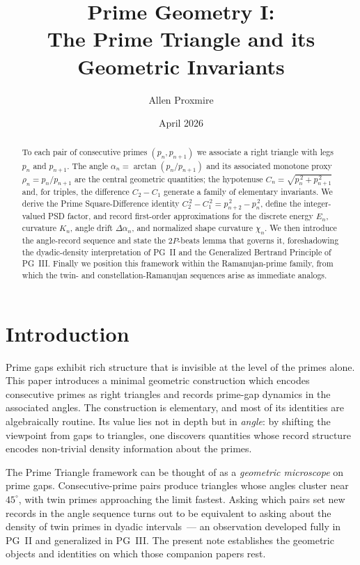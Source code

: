 \documentclass[11pt]{article}
\title{Prime Geometry I:\\
The Prime Triangle and its Geometric Invariants}
\author{Allen Proxmire}
\date{April 2026}
\begin{document}
\maketitle

\begin{abstract}
To each pair of consecutive primes $(p_n, p_{n+1})$ we associate a
right triangle with legs $p_n$ and $p_{n+1}$. The angle
$\alpha_n = \arctan(p_n/p_{n+1})$ and its associated monotone proxy
$\rho_n = p_n / p_{n+1}$ are the central geometric quantities; the
hypotenuse $C_n = \sqrt{p_n^{\,2} + p_{n+1}^{\,2}}$ and, for triples,
the difference $C_2 - C_1$ generate a family of elementary
invariants. We derive the Prime Square-Difference identity
$C_2^{\,2} - C_1^{\,2} = p_{n+2}^{\,2} - p_n^{\,2}$, define the
integer-valued PSD factor, and record first-order approximations
for the discrete energy $E_n$, curvature $K_n$, angle drift
$\Delta \alpha_n$, and normalized shape curvature $\chi_n$. We then
introduce the angle-record sequence and state the $2P$-beats lemma
that governs it, foreshadowing the dyadic-density interpretation of
PG~II and the Generalized Bertrand Principle of PG~III. Finally we
position this framework within the Ramanujan-prime family, from
which the twin- and constellation-Ramanujan sequences arise as
immediate analogs.
\end{abstract}

\section{Introduction}

Prime gaps exhibit rich structure that is invisible at the level of
the primes alone. This paper introduces a minimal geometric
construction which encodes consecutive primes as right triangles and
records prime-gap dynamics in the associated angles. The construction
is elementary, and most of its identities are algebraically routine.
Its value lies not in depth but in \emph{angle}: by shifting the
viewpoint from gaps to triangles, one discovers quantities whose
record structure encodes non-trivial density information about the
primes.

The Prime Triangle framework can be thought of as a \emph{geometric
microscope} on prime gaps. Consecutive-prime pairs produce
triangles whose angles cluster near $45^\circ$, with twin primes
approaching the limit fastest. Asking which pairs set new records in
the angle sequence turns out to be equivalent to asking about the
density of twin primes in dyadic intervals~--- an observation
developed fully in PG~II and generalized in PG~III. The present note
establishes the geometric objects and identities on which those
companion papers rest.
\end{document}
